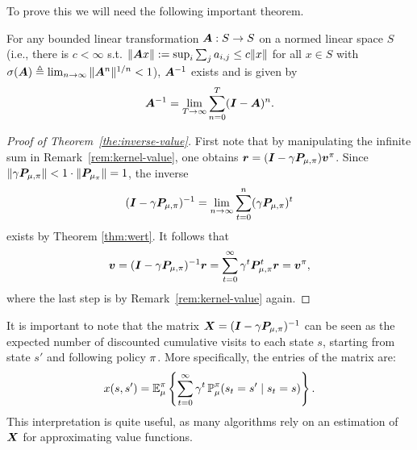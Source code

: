     To prove this we will need the following important theorem. 
    \begin{theorem}\label{thm:wert}
      For any bounded linear transformation $\matrixsym{A} : S \to S$ on a normed
      linear space $S$ (i.e., there is $c < \infty$ s.t. $\|\matrixsym{A}x\|:=\sup_i \sum_j a_{i,j} \leq c\|x\|$ for all $x \in S$ with 
      $\sigma(\matrixsym{A}) \defn \lim_{n\to \infty} \|\matrixsym{A}^n\|^{1/n} < 1$), $\matrixsym{A}^{-1}$ exists and is given by
      \begin{equation}
        \matrixsym{A}^{-1} = \lim_{T \to \infty} \sum_{n=0}^T (\ident - \matrixsym{A})^n.
      \end{equation}
    \end{theorem}

  \begin{proof}[Proof of Theorem~\ref{the:inverse-value}]
    First note that by manipulating the infinite sum in Remark~\ref{rem:kernel-value}, one obtains $\vreward = (\ident - \disc \trans_{\mdp,\pol}) \val^\pol$.
    Since $\|\disc \trans_{\mdp,\pol}\| < 1 \cdot \|\trans_{\mdp_\pol}\| = 1$, the inverse 
    \[
    (\ident - \disc \trans_{\mdp,\pol})^{-1} = \lim_{n \to \infty} \sum_{t=0}^n (\disc \trans_{\mdp,\pol})^t
    \]
    exists by Theorem \ref{thm:wert}.
    It follows that
    \[
    \val = (\ident - \disc \trans_{\mdp,\pol})^{-1} \vreward
    = \sum_{t=0}^\infty \disc^t \trans_{\mdp,\pol}^t \vreward = \val^\pol,
    \]
    where the last step is by Remark~\ref{rem:kernel-value} again.%
  \end{proof}
It is important to note that the matrix $\matrixsym{X} = (\ident - \disc \trans_{\mdp,\pol})^{-1}$ can be seen as the expected number of discounted cumulative visits to each state $s$, starting from state $s'$ and following policy $\pi$. More specifically, the entries of the matrix are:
\begin{equation}
x(s,s') = \mathop{\mbox{\ensuremath{\mathbb{E}}}}\nolimits^\pi_\mu
\left\{
  \sum_{t=0}^\infty \gamma^t \mathop{\mbox{\ensuremath{\mathbb{P}}}}\nolimits_\mu^\pi(s_t = s' \mid s_t = s)
\right\}.
\label{eq:cumulative-visits}
\end{equation}
This interpretation is quite useful, as many algorithms rely on an estimation of $\matrixsym{X}$ for approximating value functions.

